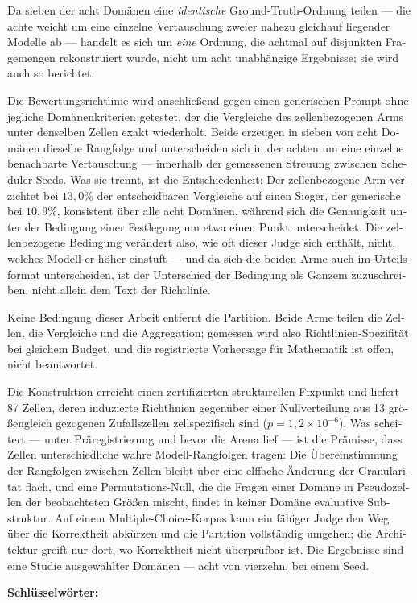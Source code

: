 \begin{otherlanguage}{ngerman}
Da sieben der acht Domänen eine \emph{identische}
Ground-Truth-Ordnung teilen --- die achte weicht um eine einzelne
Vertauschung zweier nahezu gleichauf liegender Modelle ab --- handelt
es sich um \emph{eine} Ordnung, die achtmal auf disjunkten
Fragemengen rekonstruiert wurde, nicht um acht unabhängige
Ergebnisse; sie wird auch so berichtet.

Die Bewertungsrichtlinie wird anschließend gegen einen generischen
Prompt ohne jegliche Domänenkriterien getestet, der die Vergleiche
des zellenbezogenen Arms unter denselben Zellen exakt wiederholt.
Beide erzeugen in sieben von acht Domänen dieselbe Rangfolge und
unterscheiden sich in der achten um eine einzelne benachbarte
Vertauschung --- innerhalb der gemessenen Streuung zwischen
Scheduler-Seeds. Was sie trennt, ist die Entschiedenheit: Der
zellenbezogene Arm verzichtet bei $13{,}0\%$ der entscheidbaren
Vergleiche auf einen Sieger, der generische bei $10{,}9\%$,
konsistent über alle acht Domänen, während sich die Genauigkeit unter
der Bedingung einer Festlegung um etwa einen Punkt unterscheidet. Die
zellenbezogene Bedingung verändert also, wie oft dieser Judge sich
enthält, nicht, welches Modell er höher einstuft --- und da sich die
beiden Arme auch im Urteilsformat unterscheiden, ist der Unterschied
der Bedingung als Ganzem zuzuschreiben, nicht allein dem Text der
Richtlinie.

Keine Bedingung dieser Arbeit entfernt die Partition. Beide Arme
teilen die Zellen, die Vergleiche und die Aggregation; gemessen wird
also Richtlinien-Spezifität bei gleichem Budget, und die registrierte
Vorhersage für Mathematik ist offen, nicht beantwortet.

Die Konstruktion erreicht einen zertifizierten strukturellen Fixpunkt
und liefert 87 Zellen, deren induzierte Richtlinien gegenüber einer
Nullverteilung aus 13 größengleich gezogenen Zufallszellen
zellspezifisch sind ($p = 1{,}2 \times 10^{-6}$). Was scheitert ---
unter Präregistrierung und bevor die Arena lief --- ist die Prämisse,
dass Zellen unterschiedliche wahre Modell-Rangfolgen tragen: Die
Übereinstimmung der Rangfolgen zwischen Zellen bleibt über eine
elffache Änderung der Granularität flach, und eine Permutations-Null,
die die Fragen einer Domäne in Pseudozellen der beobachteten Größen
mischt, findet in keiner Domäne evaluative Substruktur. Auf einem
Multiple-Choice-Korpus kann ein fähiger Judge den Weg über die
Korrektheit abkürzen und die Partition vollständig umgehen; die
Architektur greift nur dort, wo Korrektheit nicht überprüfbar ist.
Die Ergebnisse sind eine Studie ausgewählter Domänen --- acht von
vierzehn, bei einem Seed.
\par\medskip
\noindent\textbf{Schlüsselwörter:} \itshape \germankeywords
\end{otherlanguage}
